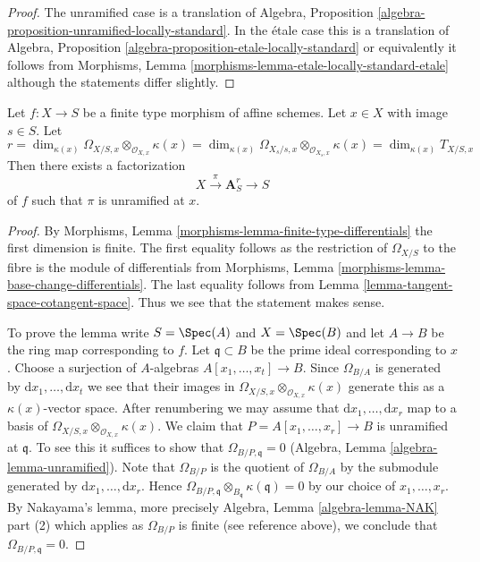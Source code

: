 \begin{proof}
The unramified case is a translation of
Algebra, Proposition \ref{algebra-proposition-unramified-locally-standard}.
In the \'etale case this is a translation of
Algebra, Proposition \ref{algebra-proposition-etale-locally-standard}
or equivalently it follows from
Morphisms, Lemma \ref{morphisms-lemma-etale-locally-standard-etale}
although the statements differ slightly.
\end{proof}

\begin{lemma}
\label{lemma-unramfied-over-affine}
Let $f : X \to S$ be a finite type morphism of affine schemes.
Let $x \in X$ with image $s \in S$. Let
$$
r =
\dim_{\kappa(x)} \Omega_{X/S, x} \otimes_{\mathcal{O}_{X, x}} \kappa(x) =
\dim_{\kappa(x)} \Omega_{X_s/s, x} \otimes_{\mathcal{O}_{X_s, x}} \kappa(x) =
\dim_{\kappa(x)} T_{X/S, x}
$$
Then there exists a factorization
$$
X \xrightarrow{\pi} \mathbf{A}^r_S \to S
$$
of $f$ such that $\pi$ is unramified at $x$.
\end{lemma}

\begin{proof}
By Morphisms, Lemma \ref{morphisms-lemma-finite-type-differentials}
the first dimension is finite.
The first equality follows as the restriction of
$\Omega_{X/S}$ to the fibre is the module of differentials
from Morphisms, Lemma
\ref{morphisms-lemma-base-change-differentials}.
The last equality follows from Lemma \ref{lemma-tangent-space-cotangent-space}.
Thus we see that the statement makes sense.

\medskip\noindent
To prove the lemma write $S = \Spec(A)$ and $X = \Spec(B)$ and let
$A \to B$ be the ring map corresponding to $f$. Let $\mathfrak q \subset B$
be the prime ideal corresponding to $x$. Choose a surjection of $A$-algebras
$A[x_1, \ldots, x_t] \to B$. Since $\Omega_{B/A}$ is generated by
$\text{d}x_1, \ldots, \text{d}x_t$ we see that their images in
$\Omega_{X/S, x} \otimes_{\mathcal{O}_{X, x}} \kappa(x)$ generate
this as a $\kappa(x)$-vector space. After renumbering we may assume
that $\text{d}x_1, \ldots, \text{d}x_r$ map to a basis of
$\Omega_{X/S, x} \otimes_{\mathcal{O}_{X, x}} \kappa(x)$.
We claim that $P = A[x_1, \ldots, x_r] \to B$ is unramified at $\mathfrak q$.
To see this it suffices to show that $\Omega_{B/P, \mathfrak q} = 0$
(Algebra, Lemma \ref{algebra-lemma-unramified}).
Note that $\Omega_{B/P}$ is the quotient of $\Omega_{B/A}$ by the
submodule generated by $\text{d}x_1, \ldots, \text{d}x_r$.
Hence
$\Omega_{B/P, \mathfrak q} \otimes_{B_\mathfrak q} \kappa(\mathfrak q) = 0$
by our choice of $x_1, \ldots, x_r$.
By Nakayama's lemma, more precisely Algebra, Lemma \ref{algebra-lemma-NAK}
part (2) which applies as $\Omega_{B/P}$ is finite (see reference above),
we conclude that $\Omega_{B/P, \mathfrak q} = 0$.
\end{proof}

